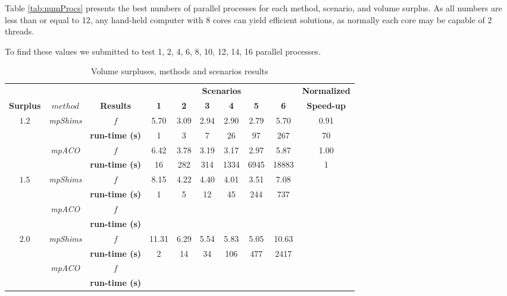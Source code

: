 \documentclass[preprint,authoryear]{elsarticle}
\begin{document}
Table \ref{tab:numProcs} presents the best numbers of parallel processes for each method, scenario, and volume surplus. As all numbers are less than or equal to 12, any hand-held computer with 8 cores can yield efficient solutions, as normally each core may be capable of 2 threads.

To find these values we submitted to test 1, 2, 4, 6, 8, 10, 12, 14, 16 parallel processes.


\vspace{2.0mm}

\begin{table}[H]
	\centering
	\caption{Volume surpluses, methods and scenarios results}  \label{tab:results}
	\footnotesize
	\begin{tabular}{cccccccccc}
		\toprule
		              &            &                  &\multicolumn{6}{c}{\bf Scenarios}              &{\bf Normalized}\\
		\cmidrule{4-9}		
		{\bf Surplus} & {$method$} &{\bf Results}     &{\bf 1}&{\bf 2}&{\bf 3}&{\bf 4}&{\bf 5}&{\bf 6}&{\bf Speed-up} \\
		\toprule


		
		\multirow{4}{*}{$1.2$} &\multirow{2}{*}{\it {mpShims}} & $f$                & 5.70  & 3.09  & 2.94  & 2.90  & 2.79  & 5.70  & 0.91  \\%
		                       &                               & {\bf run-time (s)} & 1     & 3     & 7     & 26    & 97    & 267   & 70  \\%
		                       \cmidrule{2-10}
		                       &\multirow{2}{*}{\it {mpACO}}   & $f$                & 6.42  & 3.78  &  3.19 & 3.17  & 2.97  & 5.87  & 1.00  \\ %
                               &                               & {\bf run-time (s)} & 16    & 282   &  314  & 1334  & 6945  & 18883 & 1  \\ %
		\midrule
		\multirow{4}{*}{$1.5$} &\multirow{2}{*}{\it {mpShims}} & $f$                & 8.15  & 4.22  & 4.40  & 4.01  & 3.51  & 7.08  &   \\
		                       &                               & {\bf run-time (s)} & 1     & 5     & 12    & 45    & 244   & 737   &   \\
		\cmidrule{2-10}
		                       &\multirow{2}{*}{\it {mpACO}}   & $f$                &&&&&&&\\
		                       &                               & {\bf run-time (s)} &&&&&&&\\
		\midrule
		\multirow{4}{*}{$2.0$} &\multirow{2}{*}{\it {mpShims}} & $f$                & 11.31 & 6.29  & 5.54  & 5.83  & 5.05  & 10.63 &   \\
		                       &                               & {\bf run-time (s)} & 2     & 14    & 34    & 106   & 477   & 2417  &   \\
		\cmidrule{2-10}
		                       &\multirow{2}{*}{\it {mpACO}}   & $f$                &&&&&&&\\
		                       &                               & {\bf run-time (s)} &&&&&&&\\


\end{tabular}
\end{table}
\end{document}
